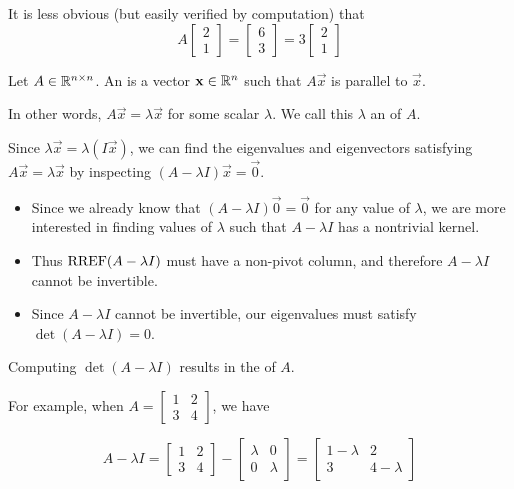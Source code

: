 \begin{applicationActivities}{3}{27}
\begin{observation}
It is less obvious (but easily verified by computation) that
$$A\begin{bmatrix} 2 \\ 1 \end{bmatrix} = \begin{bmatrix} 6 \\ 3 \end{bmatrix} = 3\begin{bmatrix} 2 \\ 1 \end{bmatrix}$$
\end{observation}

\begin{definition}Let $A \in \mathbb{R}^{n \times n}$.
An  is a vector $\mathbf{x} \in \mathbb{R}^n$ such that $A\vec{x}$ is parallel to $\vec{x}$.

In other words, $A\vec{x}=\lambda \vec{x}$ for some scalar $\lambda$.
We call this \(\lambda\) an  of \(A\).
\end{definition}

\begin{observation}
Since \(\lambda\vec x=\lambda (I\vec x)\), we can find the eigenvalues and
eigenvectors satisfying $A\vec{x}=\lambda \vec{x}$ by inspecting
$(A-\lambda I)\vec{x} = \vec0$.
\begin{itemize}
\item Since we already know that $(A-\lambda I)\vec0 = \vec0$
for any value of \(\lambda\),
we are more interested in finding values of $\lambda$ such that
$A-\lambda I$ has a nontrivial kernel.
\item Thus \(\operatorname{RREF}(A-\lambda I)\) must have a non-pivot column, and therefore
\(A-\lambda I\) cannot be invertible.
\item
Since \(A-\lambda I\) cannot be invertible, our eigenvalues must satisfy
\(\det(A-\lambda I)=0\).
\end{itemize}
\end{observation}

\begin{definition}
Computing \(\det(A-\lambda I)\) results in the
 of \(A\).

For example, when
\(A=\begin{bmatrix}1 & 2 \\ 3 & 4\end{bmatrix}\), we have

\[
  A-\lambda I=
  \begin{bmatrix}1 & 2 \\ 3 & 4\end{bmatrix}-
  \begin{bmatrix}\lambda & 0 \\ 0 & \lambda\end{bmatrix}=
  \begin{bmatrix}1-\lambda & 2 \\ 3 & 4-\lambda\end{bmatrix}
\]


\end{definition}
\end{applicationActivities}
